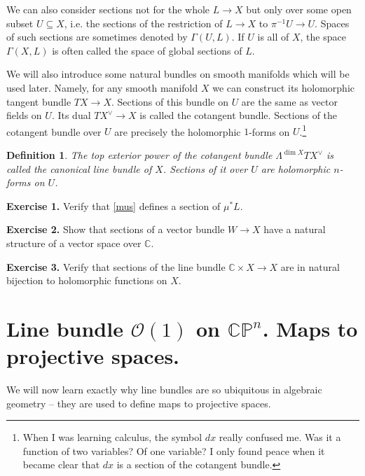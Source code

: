 \documentclass[11pt]{article}
\numberwithin{equation}{section}
\numberwithin{footnote}{section}
\newtheorem{defn}[thm]{Definition}
\newcommand{\blue}{\color{blue}}
\renewcommand{\P}{{\mathbb P}}
\newcommand{\C}{{\mathbb C}}
\begin{document}
\smallskip
We can also consider sections not for the whole $L\to X$ but only over some open subset $U\subseteq X$, i.e. the sections of the restriction of $L\to X$ to $\pi^{-1} U \to U$. Spaces of such sections  are sometimes denoted by $\Gamma(U,L)$. If $U$ is all of $X$, the space $\Gamma(X,L)$ is often called the space of {\blue global sections} of $L$.


\smallskip{\blue \hrule}
We will also introduce some natural bundles on smooth manifolds which will be used later. Namely, for any smooth manifold $X$ we can construct its holomorphic tangent bundle $TX\to X$. Sections of this bundle on $U$ are the same as vector fields on $U$. Its dual $TX^{\vee}\to X$ is called the cotangent bundle. Sections of the cotangent bundle over $U$ are precisely the holomorphic $1$-forms on $U$.\footnote{ When I was learning calculus, the symbol $dx$ really confused me. Was it a function of two variables? Of one variable? I only found peace when it became clear that $dx$ is a section of the cotangent bundle.} 

\smallskip
\begin{defn}\label{canonical}
The top exterior power of the cotangent bundle $\Lambda^{\dim X} TX^\vee$ is called the {\blue canonical line bundle} of $X$. Sections of it over $U$ are holomorphic $n$-forms on $U$.
\end{defn}


\smallskip
{\bf Exercise 1.} Verify that \eqref{mus} defines a section of $\mu^*L$.

{\bf Exercise 2.} Show that sections of a vector bundle $W\to X$ have a natural structure of a vector space over $\C$.

{\bf Exercise 3.} Verify that sections of the line bundle $\C\times X\to X$ are in natural bijection to holomorphic functions on $X$.



\section{Line bundle ${\mathcal O}(1)$ on $\C\P^n$. Maps to projective spaces.}\label{sec.maps}
We will now learn exactly why line bundles are so ubiquitous in algebraic geometry -- they are used to define maps to projective spaces.
\end{document}
